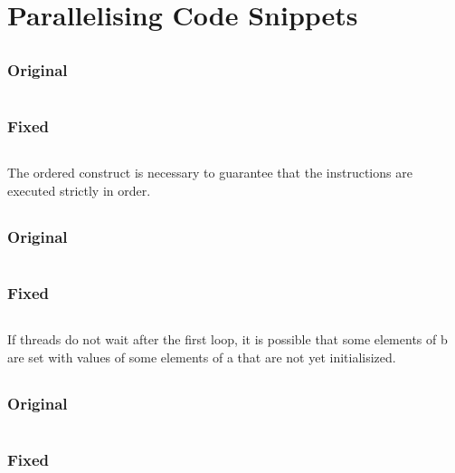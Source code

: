 \documentclass[parskip]{scrartcl}
\begin{document}
	\inputminted[linenos]{bash}{ex1/ex1_improved.c}
	
	\section{Parallelising Code Snippets}
	\subsection{}
	\subsubsection{Original}
	\inputminted{c}{ex2/01.c}
	
	\subsubsection{Fixed}
	\inputminted{c}{ex2/01_fixed.c}
	The ordered construct is necessary to guarantee that the instructions are executed strictly in order.
	
	\subsection{}
	\subsubsection{Original}
	\inputminted{c}{ex2/02.c}
	
	\subsubsection{Fixed}
	\inputminted{c}{ex2/02_fixed.c}
	
	If threads do not wait after the first loop, it is possible that some elements of b are set with values of some elements of a that are not yet initialisized.
	
	\subsection{}
	\subsubsection{Original}
	\inputminted{c}{ex2/03.c}
	
	\subsubsection{Fixed}
	\inputminted{c}{ex2/03_fixed.c}
	
\end{document}

